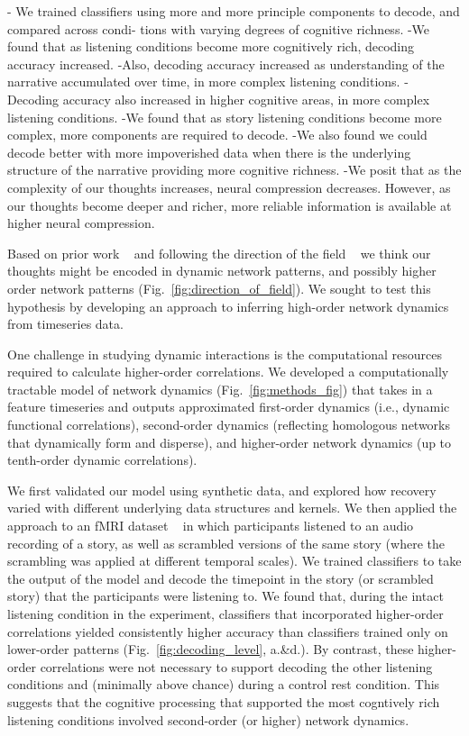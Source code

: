 

- We trained classifiers using more and more principle components to decode, and compared across condi- tions with varying degrees of cognitive richness.
-We found that as listening conditions become more cognitively rich,
decoding accuracy increased.
-Also, decoding accuracy increased as understanding of the narrative
accumulated over time, in more complex listening conditions.
- Decoding accuracy also increased in higher cognitive areas, in more complex listening conditions.
-We found that as story listening conditions become more complex, more
components are required to decode.
-We also found we could decode better with more impoverished data when
there is the underlying structure of the narrative providing more cognitive richness.
-We posit that as the complexity of our thoughts increases, neural
compression decreases. However, as our thoughts become deeper and richer, more reliable information is available at higher neural compression.







Based on prior work ~\citep{Deme19} and following the direction of the field ~\citep{Turk13} we think our thoughts might be encoded in
dynamic network patterns, and possibly higher order network
patterns (Fig.~\ref{fig:direction_of_field}). We sought to test this hypothesis by developing an approach
to inferring high-order network dynamics from timeseries data. 

One challenge in studying dynamic interactions is the
computational resources required to calculate higher-order correlations. 
We developed a computationally tractable model of network dynamics (Fig.~\ref{fig:methods_fig}) that takes in a feature
timeseries and outputs approximated first-order dynamics (i.e.,
dynamic functional correlations), second-order dynamics
(reflecting homologous networks that dynamically form and disperse),
and higher-order network dynamics (up to tenth-order dynamic
correlations).

We first validated our model using synthetic data, and explored how
recovery varied with different underlying data structures and kernels.   We then 
applied the approach to an fMRI dataset
~\citep{SimoEtal16} in which participants listened to an audio
recording of a story, as well as scrambled versions of the same story
(where the scrambling was applied at different temporal scales).  We
trained classifiers to take the output of the model and decode the
timepoint in the story (or scrambled story) that the participants were
listening to. We found that, during the intact listening condition in the
experiment, classifiers that incorporated higher-order correlations
yielded consistently higher accuracy than classifiers trained only on
lower-order patterns (Fig.~\ref{fig:decoding_level},  a.\&d.).  By contrast, these
higher-order correlations were not necessary to support decoding the other
listening conditions and (minimally
above chance) during a control rest condition.  This suggests
that the cognitive processing that supported the most cogntively rich listening conditions
involved second-order (or higher) network dynamics.

